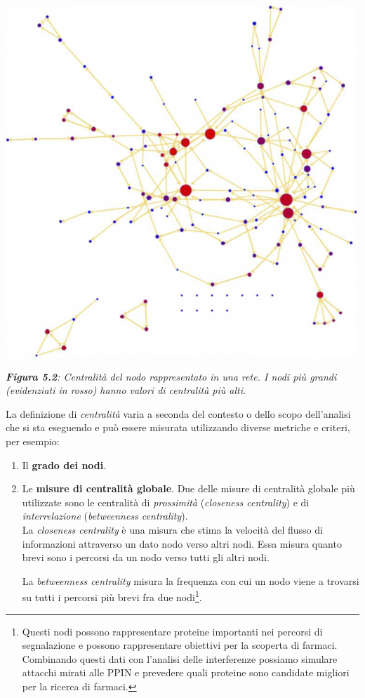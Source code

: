 \documentclass[11pt]{article}
\begin{document}
\begin{center}
\includegraphics[scale=0.4]{ca}

\begin{small}\textit{\textbf{Figura 5.2}: Centralità del nodo rappresentato in una rete. I nodi più grandi (evidenziati in rosso) hanno valori di centralità più alti}.\end{small}
\end{center}

La definizione di \textit{centralità} varia a seconda del contesto o dello scopo dell'analisi che si sta eseguendo e può essere misurata utilizzando diverse metriche e criteri, per esempio:

\begin{enumerate}
\setlength{\itemsep}{1pt}
  \setlength{\parskip}{0pt}
  \setlength{\parsep}{0pt}
\item Il \textbf{grado dei nodi}.
\item Le \textbf{misure di centralità globale}. Due delle misure di centralità globale più utilizzate sono le centralità di \textit{prossimità} (\textit{closeness centrality}) e di \textit{interrelazione} (\textit{betweenness centrality}).\\

La \textit{closeness centrality} è una misura che stima la velocità del flusso di informazioni attraverso un dato nodo verso altri nodi. Essa misura quanto brevi sono i percorsi da un nodo verso tutti gli altri nodi.

La \textit{betweenness centrality} misura la frequenza con cui un nodo viene a trovarsi su tutti i percorsi più brevi fra due nodi\footnote{Questi nodi possono rappresentare proteine importanti nei percorsi di segnalazione e possono rappresentare obiettivi per la scoperta di farmaci. Combinando questi dati con l'analisi delle interferenze possiamo simulare attacchi mirati alle PPIN e prevedere quali proteine sono candidate migliori per la ricerca di farmaci.}.
\end{enumerate}
\end{document}
